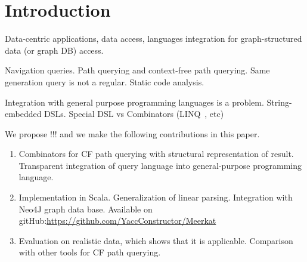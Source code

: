 \section{Introduction}

Data-centric applications, data access, languages integration for graph-structured data (or graph DB) access.

Navigation queries.
Path querying and context-free path querying.
Same generation query is not a regular.
Static code analysis.

Integration with general purpose programming languages is a problem.
String-embedded DSLs.
Special DSL vs Combinators (LINQ~\cite{LINQ1, LINQ2}, etc)~\cite{ScalaGraphParsing}

We propose !!! and we make the following contributions in this paper.
\begin{enumerate}
\item Combinators for CF path querying with structural representation of result.
 Transparent integration of query language into general-purpose programming language.
\item Implementation in Scala. Generalization of linear parsing. Integration with Neo4J graph data base. Available on gitHub:\url{https://github.com/YaccConstructor/Meerkat}
\item Evaluation on realistic data, which shows that it is applicable. Comparison  with other tools 
for CF path querying.
\end{enumerate}